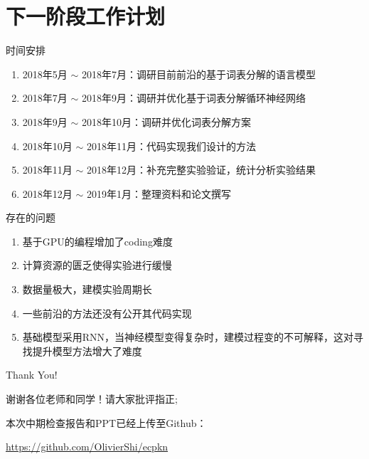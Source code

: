 \documentclass[14pt]{Bredelebeamer}
\begin{document}
\section{下一阶段工作计划}
\begin{frame}{时间安排}
	\begin{block}{}
\begin{enumerate}
  \item 2018年5月 $\sim$ 2018年7月：调研目前前沿的基于词表分解的语言模型
  \item 2018年7月 $\sim$ 2018年9月：调研并优化基于词表分解循环神经网络
  \item 2018年9月 $\sim$ 2018年10月：调研并优化词表分解方案
  \item 2018年10月 $\sim$ 2018年11月：代码实现我们设计的方法
  \item 2018年11月 $\sim$ 2018年12月：补充完整实验验证，统计分析实验结果
  \item 2018年12月 $\sim$ 2019年1月：整理资料和论文撰写
\end{enumerate}
    \end{block}
\end{frame}

\begin{frame}{存在的问题}
\begin{block}{}
\begin{enumerate}
  \item 基于GPU的编程增加了coding难度
  \item 计算资源的匮乏使得实验进行缓慢
  \item 数据量极大，建模实验周期长
  \item 一些前沿的方法还没有公开其代码实现
  \item 基础模型采用RNN，当神经模型变得复杂时，建模过程变的不可解释，这对寻找提升模型方法增大了难度
\end{enumerate}
\end{block}
\end{frame}

\begin{frame}
	\centering
    \Huge Thank You!

    \small

    谢谢各位老师和同学！请大家批评指正;

	本次中期检查报告和PPT已经上传至Github：

    \url{https://github.com/OlivierShi/ecpkn}
	
\end{frame}
\end{document}
